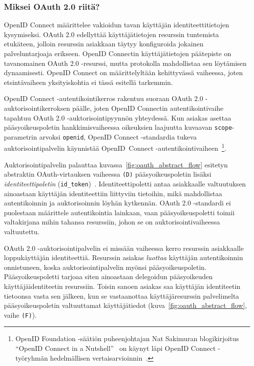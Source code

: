 \documentclass[finnish,gradu]{tktltiki}
\begin{document}
  \subsubsection{Miksei OAuth 2.0 riitä?} %
  \label{ssub:miksei_oauth_riita}

  OpenID Connect määrittelee vakioidun tavan käyttäjän identiteettitietojen kysymiseksi. OAuth 2.0 edellyttää käyttäjätietojen resurssin tuntemista etukäteen, jolloin resurssin asiakkaan täytyy konfiguroida jokainen palveluntarjoaja erikseen. OpenID Connectin käyttäjätietojen päätepiste on tavanomainen OAuth 2.0 -resurssi, mutta protokolla mahdollistaa sen löytämisen dynaamisesti. OpenID Connect on määrittelyltään kehittyvässä vaiheessa, joten etsintävaiheen yksityiskohtia ei tässä esitellä tarkemmin.

  OpenID Connect -autentikointikerros rakentuu suoraan OAuth 2.0 -auktorisointi\-kerroksen päälle, joten OpenID Connectin autentikointivaihe tapahtuu OAuth 2.0 -auktorisointi\-pyynnön yhteydessä. Kun asiakas asettaa pääsyoikeuspoletin hankkimisvaiheessa oikeuksien laajuutta kuvaavan \verb!scope!-para\-metrin arvoksi \verb!openid!, \mbox{OpenID} Connect -stan\-dar\-dia tukeva auktorisointipalvelin käynnistää \mbox{OpenID Connect} -au\-ten\-ti\-kointi\-vaiheen~\cite{sakimura_openid_c_nutshell_2012}\footnote{
  OpenID Foundation -säätiön puheenjohtajan Nat Sakimuran blogikirjoitus ``OpenID Connect in a Nutshell''~\cite{sakimura_openid_c_nutshell_2012} on käynyt läpi OpenID Connect -työryhmän  hedelmällisen vertaisarvioinnin~\cite{openid_c_nutshell_peer_review_1_2012, openid_c_nutshell_peer_review_2_2012}.
  }.

  Auktorisointipalvelin palauttaa kuvassa~\ref{fig:oauth_abstract_flow} esitetyn abstraktin OAuth-virtauksen vaiheessa \verb!(D)! pääsyoikeuspoletin lisäksi \emph{identiteettipoletin} (\verb!id_token!)~\cite{bradley_openid_c_id_token_2012}. Identiteettipoletti antaa asiakkaalle valtuutuksen ainoastaan käyttäjän identiteettiin liittyviin tietoihin, mikä mahdollistaa autentikoinnin ja auktorisoinnin löyhän kytkennän. OAuth 2.0 -standardi ei puolestaan määrittele autentikointia lainkaan, vaan pääsyoikeuspoletti toimii valtakirjana mihin tahansa resurssiin, johon se on auktorisointivaiheessa valtuutettu.

  OAuth 2.0 -auktorisointipalvelin ei missään vaiheessa kerro resurssin asiakkaalle loppukäyttäjän identiteettiä. Resurssin asiakas \emph{luottaa} käyttäjän autentikoinnin onnistuneen, koska auktorisointipalvelin myönsi pääsyoikeuspoletin. Pääsyoikeuspoletti tarjoaa siten ainoastaan delegoidun pääsyoikeuden käyttäjäidentiteetin resurssiin. Toisin sanoen asiakas saa käyttäjän identiteetin tietoonsa vasta sen jälkeen, kun se vastaanottaa käyttäjäresurssin palvelimelta pääsyoikeuspoletin valtuuttamat käyttäjätiedot (kuva~\ref{fig:oauth_abstract_flow}, vaihe \verb!(F)!).
\end{document}
